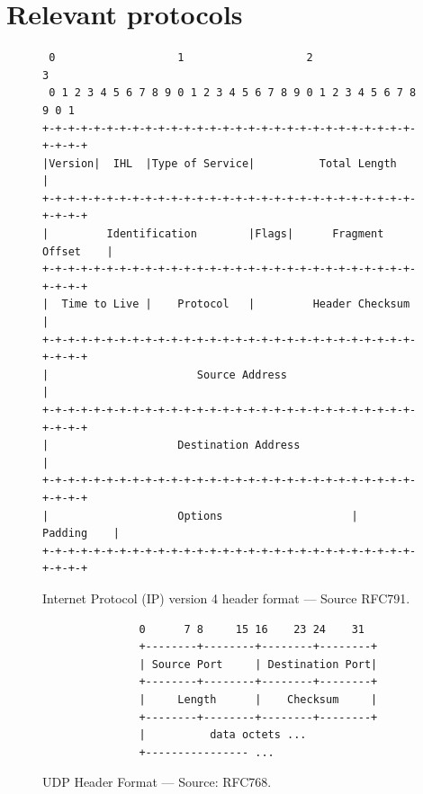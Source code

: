 \documentclass[pdftex,12pt,a4paper]{article}
\begin{document}
    \section{Relevant protocols}
                \begin{figure}[tbh]
                    \centering
                    \begin{verbatim} 0                   1                   2                   3
 0 1 2 3 4 5 6 7 8 9 0 1 2 3 4 5 6 7 8 9 0 1 2 3 4 5 6 7 8 9 0 1
+-+-+-+-+-+-+-+-+-+-+-+-+-+-+-+-+-+-+-+-+-+-+-+-+-+-+-+-+-+-+-+-+
|Version|  IHL  |Type of Service|          Total Length         |
+-+-+-+-+-+-+-+-+-+-+-+-+-+-+-+-+-+-+-+-+-+-+-+-+-+-+-+-+-+-+-+-+
|         Identification        |Flags|      Fragment Offset    |
+-+-+-+-+-+-+-+-+-+-+-+-+-+-+-+-+-+-+-+-+-+-+-+-+-+-+-+-+-+-+-+-+
|  Time to Live |    Protocol   |         Header Checksum       |
+-+-+-+-+-+-+-+-+-+-+-+-+-+-+-+-+-+-+-+-+-+-+-+-+-+-+-+-+-+-+-+-+
|                       Source Address                          |
+-+-+-+-+-+-+-+-+-+-+-+-+-+-+-+-+-+-+-+-+-+-+-+-+-+-+-+-+-+-+-+-+
|                    Destination Address                        |
+-+-+-+-+-+-+-+-+-+-+-+-+-+-+-+-+-+-+-+-+-+-+-+-+-+-+-+-+-+-+-+-+
|                    Options                    |    Padding    |
+-+-+-+-+-+-+-+-+-+-+-+-+-+-+-+-+-+-+-+-+-+-+-+-+-+-+-+-+-+-+-+-+\end{verbatim}
                    \caption{Internet Protocol (IP) version 4 header format --- Source RFC791.}
                    \label{fig:ipv4}
                \end{figure}

        \begin{figure}[tbh]
                    \begin{center}
                    \begin{verbatim}
               0      7 8     15 16    23 24    31
               +--------+--------+--------+--------+
               | Source Port     | Destination Port|
               +--------+--------+--------+--------+
               |     Length      |    Checksum     |
               +--------+--------+--------+--------+
               |          data octets ...
               +---------------- ...\end{verbatim}
            \end{center}
            \vspace{-15pt}
            \caption{UDP Header Format --- Source: RFC768.}
            \label{fig:udp}
            \vspace{10pt}
        \end{figure}
\end{document}
